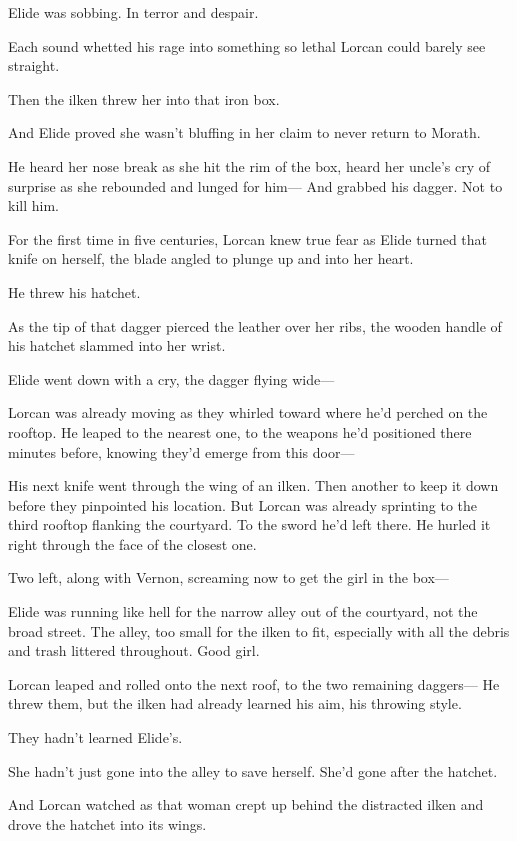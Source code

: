 Elide was sobbing.
In terror and despair.

Each sound whetted his rage into something so lethal Lorcan could barely see straight.

Then the ilken threw her into that iron box.

And Elide proved she wasn't bluffing in her claim to never return to Morath.

He heard her nose break as she hit the rim of the box, heard her uncle's cry of surprise as she rebounded and lunged for him--- And grabbed his dagger.
Not to kill him.

For the first time in five centuries, Lorcan knew true fear as Elide turned that knife on herself, the blade angled to plunge up and into her heart.

He threw his hatchet.

As the tip of that dagger pierced the leather over her ribs, the wooden handle of his hatchet slammed into her wrist.

Elide went down with a cry, the dagger flying wide---

Lorcan was already moving as they whirled toward where he'd perched on the rooftop.
He leaped to the nearest one, to the weapons he'd positioned there minutes before, knowing they'd emerge from this door---

His next knife went through the wing of an ilken.
Then another to keep it down before they pinpointed his location.
But Lorcan was already sprinting to the third rooftop flanking the courtyard.
To the sword he'd left there.
He hurled it right through the face of the closest one.

Two left, along with Vernon, screaming now to get the girl in the box---

Elide was running like hell for the narrow alley out of the courtyard, not the broad street.
The alley, too small for the ilken to fit, especially with all the debris and trash littered throughout.
Good girl.

Lorcan leaped and rolled onto the next roof, to the two remaining daggers--- He threw them, but the ilken had already learned his aim, his throwing style.

They hadn't learned Elide's.

She hadn't just gone into the alley to save herself.
She'd gone after the hatchet.

And Lorcan watched as that woman crept up behind the distracted ilken and drove the hatchet into its wings.


